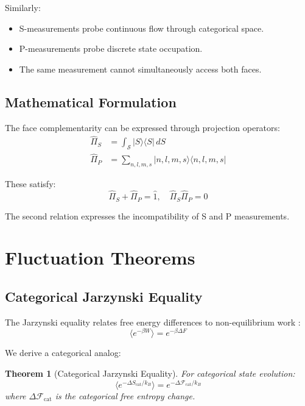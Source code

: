 \documentclass[twocolumn,10pt]{article}
\newtheorem{theorem}{Theorem}[section]
\begin{document}
Similarly:
\begin{itemize}
    \item S-measurements probe continuous flow through categorical space.
    \item P-measurements probe discrete state occupation.
    \item The same measurement cannot simultaneously access both faces.
\end{itemize}

\subsection{Mathematical Formulation}

The face complementarity can be expressed through projection operators:
\begin{align}
    \hat{\Pi}_S &= \int_{\mathcal{S}} |S\rangle \langle S| \, dS \\
    \hat{\Pi}_P &= \sum_{n,l,m,s} |n,l,m,s\rangle \langle n,l,m,s|
\end{align}

These satisfy:
\begin{equation}
    \hat{\Pi}_S + \hat{\Pi}_P = \hat{1}, \quad \hat{\Pi}_S \hat{\Pi}_P = 0
\end{equation}

The second relation expresses the incompatibility of S and P measurements.

\section{Fluctuation Theorems}

\subsection{Categorical Jarzynski Equality}

The Jarzynski equality relates free energy differences to non-equilibrium work \cite{jarzynski1997}:
\begin{equation}
    \langle e^{-\beta W} \rangle = e^{-\beta \Delta F}
\end{equation}

We derive a categorical analog:

\begin{theorem}[Categorical Jarzynski Equality]
For categorical state evolution:
\begin{equation}
    \langle e^{-\Delta S_{\text{cat}}/k_B} \rangle = e^{-\Delta \mathcal{F}_{\text{cat}}/k_B}
\end{equation}
where $\Delta \mathcal{F}_{\text{cat}}$ is the categorical free entropy change.
\end{theorem}
\end{document}
